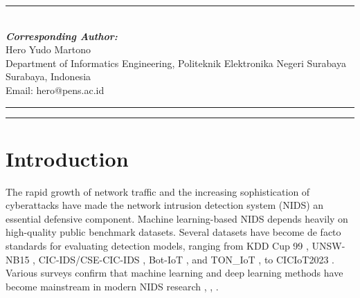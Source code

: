 \documentclass{iaesarticle}
\begin{document}
\parbox[t][][s]{0.65\textwidth}{%
\begin{abstract}
\vspace{.3em}
Machine learning-based network intrusion detection systems (NIDS) often perform well only under clean laboratory traffic and remain vulnerable to deliberate manipulation during inference, while feature dimensionality reduction improves efficiency but may enlarge the attack surface. This study evaluates and strengthens the robustness of an XGBoost model whose features were optimized using Gain-based importance, on the CSE-CIC-IDS2018 dataset (15.7 million samples, seven attack categories). The methodology has three stages: feature reduction from 68 to 10 features, simulation of Saliency Map-based evasion attacks, and Adversarial Training as defense. Because XGBoost is non-differentiable, input sensitivity is approximated numerically through finite differences over the model probability outputs. The baseline Matthews correlation coefficient (MCC) drops drastically from 0.9351 to 0.0184 (a 98\% decline) under evasion ($\epsilon=0.1$), whereas the hardened model recovers to 0.9953 on adversarial data while preserving 0.9347 on clean traffic. A robustness ablation over four configurations confirms Top-10 as the optimal sweet spot. Validation on real network traffic in an AWS cloud environment shows the robustness pattern remains consistent with offline results, demonstrating that the effectiveness of Adversarial Training is not confined to benchmark datasets.
\end{abstract}
}
\parbox[l]{\textwidth}{%
\rule{0.275\textwidth}{0.5pt} \hspace{0.5cm} \hrulefill
\\
\emph{\textbf{Corresponding Author:}}
\vspace{.5em}\\
Hero Yudo Martono\\
Department of Informatics Engineering, Politeknik Elektronika Negeri Surabaya\\
Surabaya, Indonesia\\
Email: hero@pens.ac.id
}
\vspace{.5em}
\hrule
\vspace{.1em}
\hrule


\section{Introduction}
The rapid growth of network traffic and the increasing sophistication of cyberattacks have made the network intrusion detection system (NIDS) an essential defensive component. Machine learning-based NIDS depends heavily on high-quality public benchmark datasets. Several datasets have become de facto standards for evaluating detection models, ranging from KDD Cup 99 \cite{1}, UNSW-NB15 \cite{2}, CIC-IDS/CSE-CIC-IDS \cite{3}, Bot-IoT \cite{4}, and TON\_IoT \cite{5}, to CICIoT2023 \cite{6}. Various surveys confirm that machine learning and deep learning methods have become mainstream in modern NIDS research \cite{7}, \cite{8}, \cite{9}.
\end{document}
